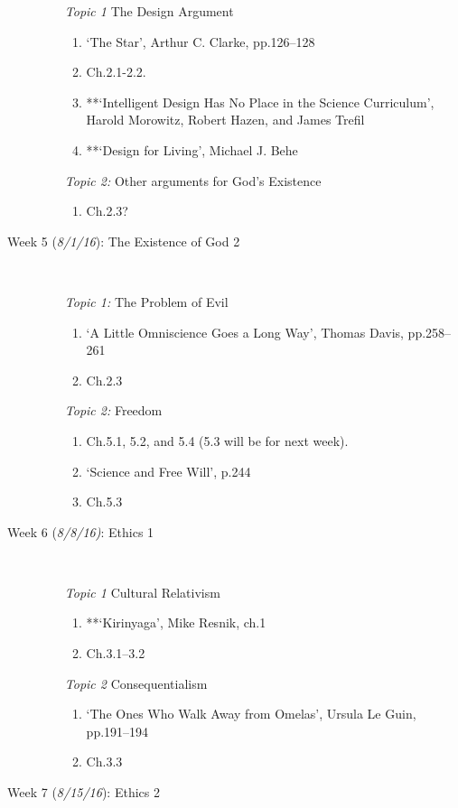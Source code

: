 \documentclass[article,oneside]{memoir}
\begin{document}
\begin{description}
\begin{enumerate}

\item[\textit{Topic 1}] The Design Argument
\begin{enumerate}
\item `The Star', Arthur C. Clarke, pp.126--128
\item Ch.2.1-2.2. 
\item **`Intelligent Design Has No Place in the Science Curriculum', Harold Morowitz, Robert Hazen, and James Trefil
 \item **`Design for Living', Michael J. Behe
\end{enumerate}

\item[\textit{Topic 2:}] Other arguments for God's Existence
\begin{enumerate}
\item Ch.2.3?
\end{enumerate}
\end{enumerate}


\item[Week 5 (\textit{8/1/16}): The Existence of God 2]\
\begin{enumerate}
\item[\textit{Topic 1:}] The Problem of Evil
\begin{enumerate} 
\item `A Little Omniscience Goes a Long Way', Thomas Davis, pp.258--261
\item Ch.2.3
\end{enumerate}
\item[\textit{Topic 2:}] Freedom
\begin{enumerate} 
\item Ch.5.1, 5.2, and 5.4 (5.3 will be for next week).
\item `Science and Free Will', p.244
\item Ch.5.3
\end{enumerate}
\end{enumerate}


\item[Week 6 (\textit{8/8/16)}: Ethics 1]\
\begin{enumerate}

\item[\textit{Topic 1}] Cultural Relativism
\begin{enumerate}
\item **`Kirinyaga', Mike Resnik, ch.1
\item Ch.3.1--3.2
\end{enumerate}
\item[\textit{Topic 2}]  Consequentialism 
\begin{enumerate}
\item  `The Ones Who Walk Away from Omelas', Ursula Le Guin, pp.191--194 
\item Ch.3.3
\end{enumerate}
\end{enumerate}
\item[Week 7 (\textit{8/15/16}): Ethics 2]\
\begin{enumerate}


\end{enumerate}
\end{description}
\end{document}
